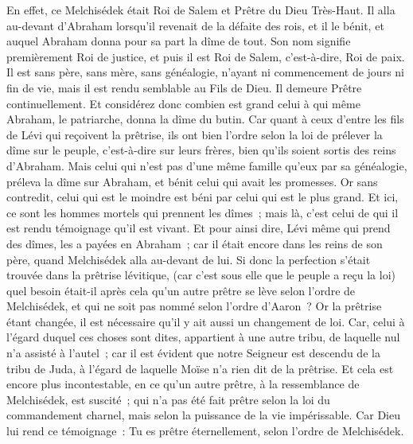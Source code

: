 \begin{multicols}{2}
\VerseOne{}En effet, ce Melchisédek était Roi de Salem et Prêtre du Dieu Très-Haut. Il alla au-devant d'Abraham lorsqu'il revenait de la défaite des rois, et il le bénit,
et auquel Abraham donna pour sa part la dîme de tout. Son nom signifie premièrement Roi de justice, et puis il est Roi de Salem, c'est-à-dire, Roi de paix.
Il est sans père, sans mère, sans généalogie, n'ayant ni commencement de jours ni fin de vie, mais il est rendu semblable au Fils de Dieu. Il demeure Prêtre continuellement.
Et considérez donc combien est grand celui à qui même Abraham, le patriarche, donna la dîme du butin.
Car quant à ceux d'entre les fils de Lévi qui reçoivent la prêtrise, ils ont bien l’ordre selon la loi de prélever la dîme sur le peuple, c'est-à-dire sur leurs frères, bien qu'ils soient sortis des reins d'Abraham.
Mais celui qui n'est pas d'une même famille qu'eux par sa généalogie, préleva la dîme sur Abraham, et bénit celui qui avait les promesses.
Or sans contredit, celui qui est le moindre est béni par celui qui est le plus grand.
Et ici, ce sont les hommes mortels qui prennent les dîmes~; mais là, c'est celui de qui il est rendu témoignage qu'il est vivant.
Et pour ainsi dire, Lévi même qui prend des dîmes, les a payées en Abraham~;
car il était encore dans les reins de son père, quand Melchisédek alla au-devant de lui.
Si donc la perfection s'était trouvée dans la prêtrise lévitique, (car c'est sous elle que le peuple a reçu la loi) quel besoin était-il après cela qu'un autre prêtre se lève selon l'ordre de Melchisédek, et qui ne soit pas nommé selon l'ordre d'Aaron~?
Or la prêtrise étant changée, il est nécessaire qu'il y ait aussi un changement de loi.
Car, celui à l'égard duquel ces choses sont dites, appartient à une autre tribu, de laquelle nul n'a assisté à l'autel~;
car il est évident que notre Seigneur est descendu de la tribu de Juda, à l'égard de laquelle Moïse n'a rien dit de la prêtrise.
Et cela est encore plus incontestable, en ce qu'un autre prêtre, à la ressemblance de Melchisédek, est suscité~;
qui n'a pas été fait prêtre selon la loi du commandement charnel, mais selon la puissance de la vie impérissable.
Car Dieu lui rend ce témoignage~: Tu es prêtre éternellement, selon l'ordre de Melchisédek.

\end{multicols}
